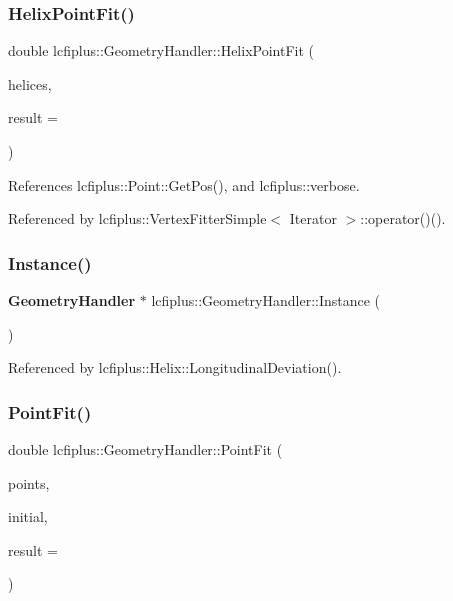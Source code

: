 \subsubsection{Helix\+Point\+Fit()}
{\footnotesize\ttfamily double lcfiplus\+::\+Geometry\+Handler\+::\+Helix\+Point\+Fit (\begin{DoxyParamCaption}\item[{const vector$<$ \textbf{ Helix} $\ast$$>$ \&}]{helices,  }\item[{\textbf{ Point} $\ast$}]{result = {} }\end{DoxyParamCaption})}



References lcfiplus\+::\+Point\+::\+Get\+Pos(), and lcfiplus\+::verbose.



Referenced by lcfiplus\+::\+Vertex\+Fitter\+Simple$<$ Iterator $>$\+::operator()().

\mbox{\label{classlcfiplus_1_1GeometryHandler_a8186dc974f9fa1b44445267381bd8dab}} 
\subsubsection{Instance()}
{\footnotesize\ttfamily \textbf{ Geometry\+Handler} $\ast$ lcfiplus\+::\+Geometry\+Handler\+::\+Instance (\begin{DoxyParamCaption}{ }\end{DoxyParamCaption})\hspace{0.3cm}{\ttfamily [static]}}



Referenced by lcfiplus\+::\+Helix\+::\+Longitudinal\+Deviation().

\mbox{\label{classlcfiplus_1_1GeometryHandler_a719d1c4165e936732c8b77f34495a210}} 
\subsubsection{Point\+Fit()}
{\footnotesize\ttfamily double lcfiplus\+::\+Geometry\+Handler\+::\+Point\+Fit (\begin{DoxyParamCaption}\item[{const vector$<$ \textbf{ Point\+Base} $\ast$$>$ \&}]{points,  }\item[{const T\+Vector3 \&}]{initial,  }\item[{\textbf{ Point} $\ast$}]{result = {} }\end{DoxyParamCaption})}



